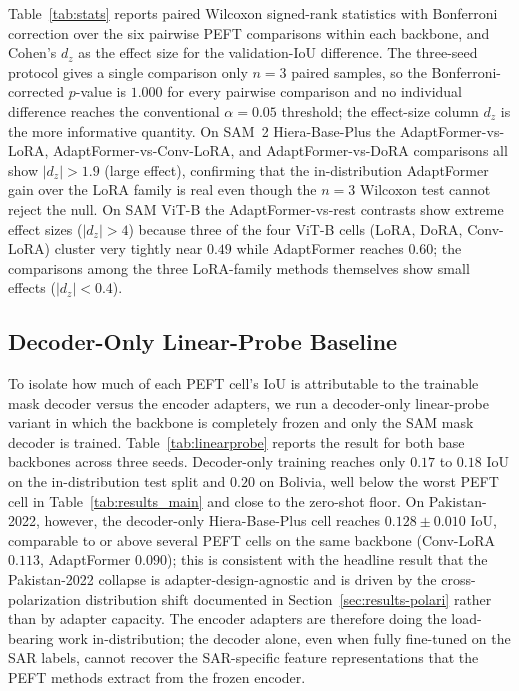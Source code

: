 \documentclass[conference]{IEEEtran}
\newcommand{\maxwidthtable}[1]{%
  \resizebox{\ifdim\width>\linewidth \linewidth\else \width\fi}{!}{#1}%
}
\begin{document}
Table~\ref{tab:stats} reports paired Wilcoxon signed-rank statistics with Bonferroni correction over the six pairwise PEFT comparisons within each backbone, and Cohen's $d_z$ as the effect size for the validation-IoU difference. The three-seed protocol gives a single comparison only $n=3$ paired samples, so the Bonferroni-corrected $p$-value is $1.000$ for every pairwise comparison and no individual difference reaches the conventional $\alpha = 0.05$ threshold; the effect-size column $d_z$ is the more informative quantity. On SAM~2 Hiera-Base-Plus the AdaptFormer-vs-LoRA, AdaptFormer-vs-Conv-LoRA, and AdaptFormer-vs-DoRA comparisons all show $|d_z| > 1.9$ (large effect), confirming that the in-distribution AdaptFormer gain over the LoRA family is real even though the $n=3$ Wilcoxon test cannot reject the null. On SAM ViT-B the AdaptFormer-vs-rest contrasts show extreme effect sizes ($|d_z| > 4$) because three of the four ViT-B cells (LoRA, DoRA, Conv-LoRA) cluster very tightly near $0.49$ while AdaptFormer reaches $0.60$; the comparisons among the three LoRA-family methods themselves show small effects ($|d_z| < 0.4$).

\begin{table}[!htbp]
\centering
\caption{Paired Wilcoxon signed-rank tests (Bonferroni-corrected) and Cohen's $d_z$ for the six pairwise PEFT comparisons within each backbone, $n=3$ seeds per cell.}
\label{tab:stats}
\maxwidthtable{%
\IfFileExists{figs/stats_significance.tex}{}{\textit{Pending sweep completion.}}%
}
\end{table}

\subsection{Decoder-Only Linear-Probe Baseline}
\label{sec:results-linearprobe}

To isolate how much of each PEFT cell's IoU is attributable to the trainable mask decoder versus the encoder adapters, we run a decoder-only linear-probe variant in which the backbone is completely frozen and only the SAM mask decoder is trained. Table~\ref{tab:linearprobe} reports the result for both base backbones across three seeds. Decoder-only training reaches only $0.17$ to $0.18$ IoU on the in-distribution test split and $0.20$ on Bolivia, well below the worst PEFT cell in Table~\ref{tab:results_main} and close to the zero-shot floor. On Pakistan-2022, however, the decoder-only Hiera-Base-Plus cell reaches $0.128 \pm 0.010$ IoU, comparable to or above several PEFT cells on the same backbone (Conv-LoRA $0.113$, AdaptFormer $0.090$); this is consistent with the headline result that the Pakistan-2022 collapse is adapter-design-agnostic and is driven by the cross-polarization distribution shift documented in Section~\ref{sec:results-polari} rather than by adapter capacity. The encoder adapters are therefore doing the load-bearing work in-distribution; the decoder alone, even when fully fine-tuned on the SAR labels, cannot recover the SAR-specific feature representations that the PEFT methods extract from the frozen encoder.
\end{document}
